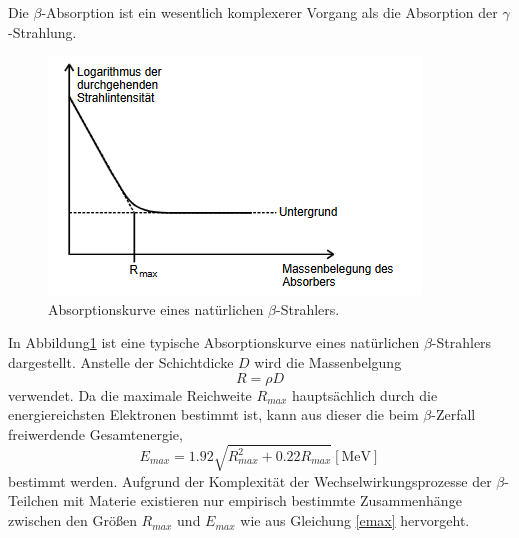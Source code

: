 \noindent Die $\beta$-Absorption ist ein wesentlich komplexerer Vorgang als die Absorption der $\gamma$-Strahlung.
\begin{figure}[H]
    \centering
    \includegraphics[scale=0.7]{content/Absorbbeta.png}
    \caption{Absorptionskurve eines natürlichen $\beta$-Strahlers. \cite{v704}}
    \label{fig:abs}
\end{figure}
\noindent
In Abbildung\ref{fig:abs} ist eine typische Absorptionskurve eines natürlichen $\beta$-Strahlers dargestellt.
Anstelle der Schichtdicke $D$ wird die Massenbelgung
\begin{equation}
  R = \rho D
\end{equation}
verwendet.
Da die maximale Reichweite $R_{max}$ hauptsächlich durch die energiereichsten Elektronen bestimmt ist, kann aus dieser die beim $\beta$-Zerfall freiwerdende Gesamtenergie,
\begin{equation}
    \label{emax}
  E_{max}= 1.92  \sqrt{R_{max}^2 +0.22R_{max}} [\si{\mega\electronvolt}]
\end{equation}
bestimmt werden.
Aufgrund der Komplexität der Wechselwirkungsprozesse der $\beta$-Teilchen mit Materie existieren nur empirisch bestimmte Zusammenhänge zwischen den Größen $R_{max}$ und $E_{max}$ wie aus Gleichung \eqref{emax} hervorgeht.
